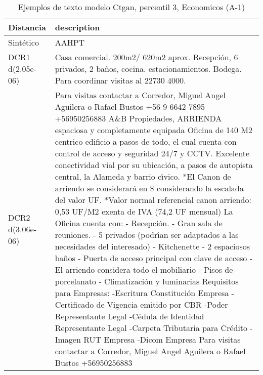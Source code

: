\begin{table}[H]
\centering
\fontsize{10}{14}\selectfont
\caption{Ejemplos de texto modelo Ctgan, percentil 3, Economicos (A-1)}
\label{table-example-economicos-a-1-ctgan-3p-text}
\begin{tabular}{|l|m{35em}|}
\hline
\rowcolor[gray]{0.8}
Distancia & description \\
\hline Sintético & AAHPT \\
\hline DCR1 d(2.05e-06) & Casa comercial. 200m2/ 620m2 aprox. Recepci\'on, 6 privados, 2 ba\~nos, cocina. estacionamientos. Bodega. Para coordinar visitas al 22730 4000. \\
\hline DCR2 d(3.06e-06) & Para visitas contactar a Corredor, Miguel Angel Aguilera o Rafael Bustos +56 9 6642 7895 +56950256883  A\&B Propiedades, ARRIENDA espaciosa y completamente equipada Oficina de 140 M2 centrico edificio a pasos de todo, el cual cuenta con control de acceso y seguridad 24/7 y CCTV. Excelente conectividad vial por su ubicaci\'on, a pasos de autopista central, la Alameda y barrio c{\'\i}vico.  *El Canon de arriendo se considerar\'a en \$ considerando la escalada del valor UF.  *Valor normal referencial canon arriendo: 0,53 UF/M2 exenta de IVA (74,2 UF mensual)  La Oficina cuenta con: - Recepci\'on. - Gran sala de reuniones. - 5 privados (podr{\'\i}an ser adaptados a las necesidades del interesado) - Kitchenette - 2 espaciosos ba\~nos - Puerta de acceso principal con clave de acceso - El arriendo considera todo el mobiliario - Pisos de porcelanato - Climatizaci\'on y luminarias  Requisitos para Empresas: -Escritura Constituci\'on Empresa -Certificado de Vigencia emitido por CBR -Poder Representante Legal -C\'edula de Identidad Representante Legal -Carpeta Tributaria para Cr\'edito -Imagen RUT Empresa -Dicom Empresa  Para visitas contactar a Corredor, Miguel Angel Aguilera o Rafael Bustos +56950256883 \\
\hline
\end{tabular}
\end{table}
